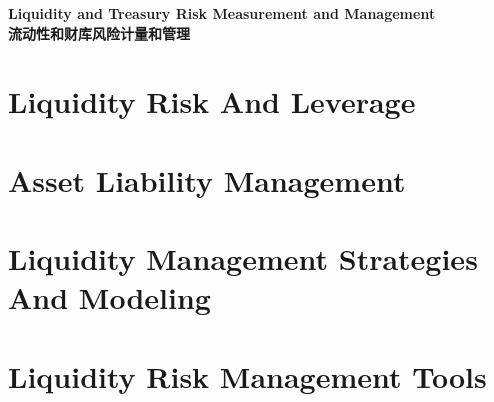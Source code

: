 \documentclass{article}
\begin{document}

\graphicspath{{images/}}

\begin{center}
\textbf{\Huge Liquidity and Treasury Risk Measurement and Management}\\
\textbf{\Huge 流动性和财库风险计量和管理}\\
\end{center}
\section{Liquidity Risk And Leverage}


\section{Asset Liability Management}


\section{Liquidity Management Strategies And Modeling}


\section{Liquidity Risk Management Tools}


%

%
\end{document}
